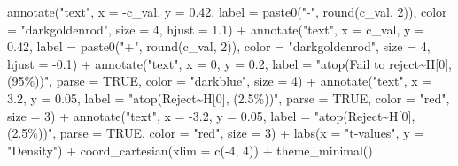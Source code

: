 \documentclass[
  letterpaper,
  DIV=11,
  numbers=noendperiod]{scrreprt}
\newenvironment{Shaded}{\begin{snugshade}}{\end{snugshade}}
\newcommand{\AttributeTok}[1]{\textcolor[rgb]{0.40,0.45,0.13}{#1}}
\newcommand{\ConstantTok}[1]{\textcolor[rgb]{0.56,0.35,0.01}{#1}}
\newcommand{\DecValTok}[1]{\textcolor[rgb]{0.68,0.00,0.00}{#1}}
\newcommand{\FloatTok}[1]{\textcolor[rgb]{0.68,0.00,0.00}{#1}}
\newcommand{\FunctionTok}[1]{\textcolor[rgb]{0.28,0.35,0.67}{#1}}
\newcommand{\NormalTok}[1]{\textcolor[rgb]{0.00,0.23,0.31}{#1}}
\newcommand{\SpecialCharTok}[1]{\textcolor[rgb]{0.37,0.37,0.37}{#1}}
\newcommand{\StringTok}[1]{\textcolor[rgb]{0.13,0.47,0.30}{#1}}
\begin{document}
\begin{Shaded}
\begin{Highlighting}[]
  \FunctionTok{annotate}\NormalTok{(}\StringTok{"text"}\NormalTok{, }\AttributeTok{x =} \SpecialCharTok{{-}}\NormalTok{c\_val, }\AttributeTok{y =} \FloatTok{0.42}\NormalTok{,}
           \AttributeTok{label =} \FunctionTok{paste0}\NormalTok{(}\StringTok{"{-}"}\NormalTok{, }\FunctionTok{round}\NormalTok{(c\_val, }\DecValTok{2}\NormalTok{)),}
           \AttributeTok{color =} \StringTok{"darkgoldenrod"}\NormalTok{, }\AttributeTok{size =} \DecValTok{4}\NormalTok{, }\AttributeTok{hjust =} \FloatTok{1.1}\NormalTok{) }\SpecialCharTok{+}
  \FunctionTok{annotate}\NormalTok{(}\StringTok{"text"}\NormalTok{, }\AttributeTok{x =}\NormalTok{ c\_val, }\AttributeTok{y =} \FloatTok{0.42}\NormalTok{,}
           \AttributeTok{label =} \FunctionTok{paste0}\NormalTok{(}\StringTok{"+"}\NormalTok{, }\FunctionTok{round}\NormalTok{(c\_val, }\DecValTok{2}\NormalTok{)),}
           \AttributeTok{color =} \StringTok{"darkgoldenrod"}\NormalTok{, }\AttributeTok{size =} \DecValTok{4}\NormalTok{, }\AttributeTok{hjust =} \SpecialCharTok{{-}}\FloatTok{0.1}\NormalTok{) }\SpecialCharTok{+}
  \FunctionTok{annotate}\NormalTok{(}\StringTok{"text"}\NormalTok{, }\AttributeTok{x =} \DecValTok{0}\NormalTok{, }\AttributeTok{y =} \FloatTok{0.2}\NormalTok{,}
           \AttributeTok{label =} \StringTok{"atop(\textquotesingle{}Fail to reject\textquotesingle{}\textasciitilde{}H[0], \textquotesingle{}(95\%)\textquotesingle{})"}\NormalTok{, }\AttributeTok{parse =} \ConstantTok{TRUE}\NormalTok{,}
           \AttributeTok{color =} \StringTok{"darkblue"}\NormalTok{, }\AttributeTok{size =} \DecValTok{4}\NormalTok{) }\SpecialCharTok{+}
  \FunctionTok{annotate}\NormalTok{(}\StringTok{"text"}\NormalTok{, }\AttributeTok{x =} \FloatTok{3.2}\NormalTok{, }\AttributeTok{y =} \FloatTok{0.05}\NormalTok{,}
           \AttributeTok{label =} \StringTok{"atop(\textquotesingle{}Reject\textquotesingle{}\textasciitilde{}H[0], \textquotesingle{}(2.5\%)\textquotesingle{})"}\NormalTok{, }\AttributeTok{parse =} \ConstantTok{TRUE}\NormalTok{,}
           \AttributeTok{color =} \StringTok{"red"}\NormalTok{, }\AttributeTok{size =} \DecValTok{3}\NormalTok{) }\SpecialCharTok{+}
  \FunctionTok{annotate}\NormalTok{(}\StringTok{"text"}\NormalTok{, }\AttributeTok{x =} \SpecialCharTok{{-}}\FloatTok{3.2}\NormalTok{, }\AttributeTok{y =} \FloatTok{0.05}\NormalTok{,}
           \AttributeTok{label =} \StringTok{"atop(\textquotesingle{}Reject\textquotesingle{}\textasciitilde{}H[0], \textquotesingle{}(2.5\%)\textquotesingle{})"}\NormalTok{, }\AttributeTok{parse =} \ConstantTok{TRUE}\NormalTok{,}
           \AttributeTok{color =} \StringTok{"red"}\NormalTok{, }\AttributeTok{size =} \DecValTok{3}\NormalTok{) }\SpecialCharTok{+}
  \FunctionTok{labs}\NormalTok{(}\AttributeTok{x =} \StringTok{"t{-}values"}\NormalTok{, }\AttributeTok{y =} \StringTok{"Density"}\NormalTok{) }\SpecialCharTok{+}
  \FunctionTok{coord\_cartesian}\NormalTok{(}\AttributeTok{xlim =} \FunctionTok{c}\NormalTok{(}\SpecialCharTok{{-}}\DecValTok{4}\NormalTok{, }\DecValTok{4}\NormalTok{)) }\SpecialCharTok{+}
  \FunctionTok{theme\_minimal}\NormalTok{()}
\end{Highlighting}
\end{Shaded}
\end{document}
